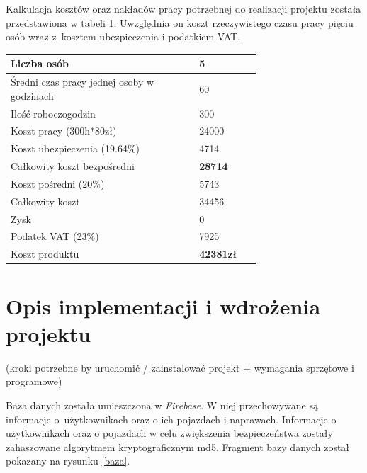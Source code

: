 \documentclass[12pt]{article}
\begin{document}
Kalkulacja kosztów oraz nakładów pracy potrzebnej do realizacji projektu została przedstawiona w tabeli \ref{kosztorys}. Uwzględnia on koszt rzeczywistego czasu pracy pięciu osób wraz z~kosztem ubezpieczenia i podatkiem VAT.

\begin{table}[H]
\begin{center}
\label{kosztorys}
	\begin{tabular}{|p{0.55\linewidth}|p{0.15\linewidth}|}%
	\hline
	Liczba osób 	& 5 				\\ \hline
	Średni czas pracy jednej osoby w godzinach		& 60\\ \hline
	Ilość roboczogodzin & 300	\\ \hline
	Koszt pracy (300h*80zł) & 24000	\\ \hline
	Koszt ubezpieczenia (19.64\%) & 4714	\\ \hline
	Całkowity koszt bezpośredni & \textbf{28714}	\\ \hline
	Koszt pośredni (20\%) & 5743\\ \hline
	Całkowity koszt & 34456\\ \hline
	Zysk & 0\\ \hline
	Podatek VAT (23\%) & 7925\\ \hline
							 \hline
	Koszt produktu & \textbf{42381zł}\\ \hline
	\end{tabular}
\end{center}
\end{table}


\newpage
\section{Opis implementacji i wdrożenia projektu}
(kroki potrzebne by uruchomić / zainstalować projekt + wymagania sprzętowe i programowe)

Baza danych została umieszczona w \textit{Firebase}. W niej przechowywane są informacje o~użytkownikach oraz o ich pojazdach i naprawach. Informacje o użytkownikach oraz o pojazdach w celu zwiększenia bezpieczeństwa zostały zahaszowane algorytmem kryptograficznym md5. Fragment bazy danych został pokazany na rysunku \ref{baza}.
\end{document}
